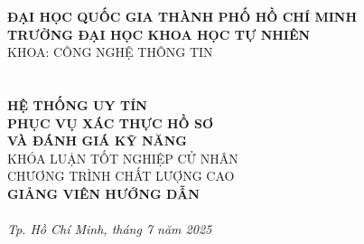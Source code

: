 \begin{titlepage}
  \begin{center}

    {\large \textbf{ĐẠI HỌC QUỐC GIA THÀNH PHỐ HỒ CHÍ MINH}} \\
    \smallskip
    {\large \textbf{TRƯỜNG ĐẠI HỌC KHOA HỌC TỰ NHIÊN}} \\
    \medskip
    KHOA: CÔNG NGHỆ THÔNG TIN \\[1.8cm]

    {\Large \bfseries \studentone} \\
    {\Large \bfseries \studenttwo} \\[2cm]

    {\huge \bfseries HỆ THỐNG UY TÍN \\ PHỤC VỤ XÁC THỰC HỒ SƠ \\[3mm] VÀ ĐÁNH GIÁ KỸ NĂNG} \\[2cm]

    {\large KHÓA LUẬN TỐT NGHIỆP CỬ NHÂN} \\
    {\large CHƯƠNG TRÌNH CHẤT LƯỢNG CAO} \\[2cm]

    {\Large \textbf{GIẢNG VIÊN HƯỚNG DẪN}} \\
    \medskip
    {\large \instructor} \\

    \vfill
    \textit{Tp. Hồ Chí Minh, tháng 7 năm 2025}
  \end{center}
\end{titlepage}